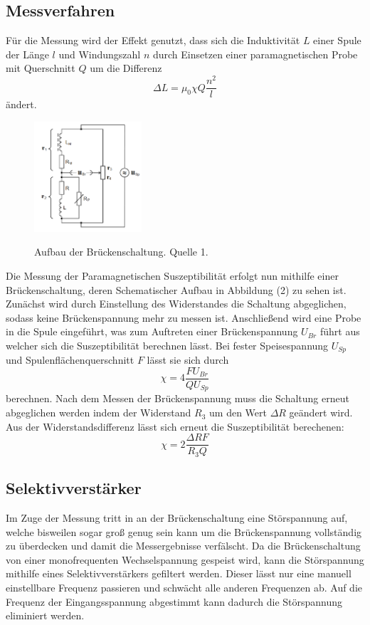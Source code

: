 \subsection{Messverfahren}
Für die Messung wird der Effekt genutzt, dass sich die Induktivität $L$ einer Spule der Länge $l$ und Windungszahl $n$ durch Einsetzen einer paramagnetischen Probe mit Querschnitt $Q$ um die Differenz
\begin{equation*}
\Delta L=\mu_0 \chi Q \frac{n^2}{l}
\end{equation*}
ändert. 
\begin{figure}[h]
    \centering
    \includegraphics[width=4cm, keepaspectratio]{Brückenschaltung}
    \label{Brueckenschaltung}
    \caption{Aufbau der Brückenschaltung. Quelle 1.}
  \end{figure}
Die Messung der Paramagnetischen Suszeptibilität erfolgt nun mithilfe einer Brückenschaltung, deren Schematischer Aufbau in Abbildung (2) zu sehen ist. Zunächst wird durch Einstellung des Widerstandes die Schaltung  abgeglichen, sodass keine Brückenspannung mehr zu messen ist. Anschließend wird eine Probe in die Spule eingeführt, was zum Auftreten einer Brückenspannung $U_{Br}$ führt aus welcher sich die Suszeptibilität berechnen lässt. Bei fester Speisespannung $U_{Sp}$ und Spulenflächenquerschnitt $F$ lässt sie sich durch
\begin{equation}
  \label{eq:sechs}
\chi=4\frac{FU_{Br}}{QU_{Sp}}
\end{equation}
berechnen. Nach dem Messen der Brückenspannung muss die Schaltung erneut abgeglichen werden indem der Widerstand $R_3$ um den Wert $\Delta R$ geändert wird. Aus der Widerstandsdifferenz lässt sich erneut die Suszeptibilität berechenen:
\begin{equation}
\chi=2\frac{\Delta R F}{R_3 Q}
\end{equation}
\subsection{Selektivverstärker}
Im Zuge der Messung tritt in an der Brückenschaltung eine Störspannung auf, welche bisweilen sogar groß genug sein kann um die Brückenspannung vollständig zu überdecken und damit die Messergebnisse verfälscht. Da die Brückenschaltung von einer monofrequenten Wechselspannung gespeist wird, kann die Störspannung mithilfe eines Selektivverstärkers gefiltert werden. Dieser lässt nur eine manuell einstellbare Frequenz passieren und schwächt alle anderen Frequenzen ab. Auf die Frequenz der Eingangsspannung abgestimmt kann dadurch die Störspannung eliminiert werden. 

